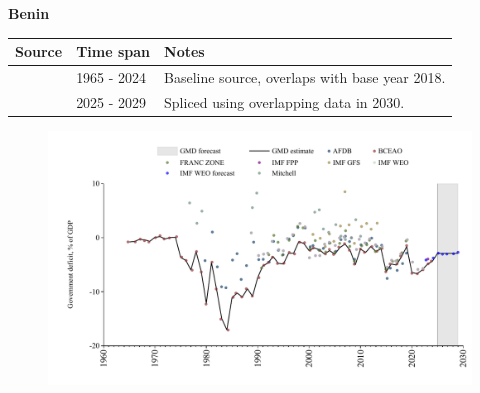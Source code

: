 \documentclass[12pt,a4paper,landscape]{article}
\begin{document}
\begin{adjustbox}{max totalsize={\paperwidth}{\paperheight},center}
\begin{minipage}[t][\textheight][t]{\textwidth}
\vspace*{0.5cm}
{}
\begin{center}
{\Large\bfseries Benin}
\end{center}
\vspace{0.5cm}
\begin{table}[H]
\centering
\small
\begin{tabular}{|l|l|l|}
\hline
\textbf{Source} & \textbf{Time span} & \textbf{Notes} \\
\hline
\rowcolor{white}\cite{BCEAO}& 1965 - 2024 &Baseline source, overlaps with base year 2018.\\
\rowcolor{lightgray}\cite{IMF_WEO_forecast}& 2025 - 2029 &Spliced using overlapping data in 2030.\\
\hline
\end{tabular}
\end{table}
\begin{figure}[H]
\centering
\includegraphics[width=\textwidth,height=0.6\textheight,keepaspectratio]{graphs/BEN_govdef_GDP.pdf}
\end{figure}
\end{minipage}
\end{adjustbox}
\end{document}
